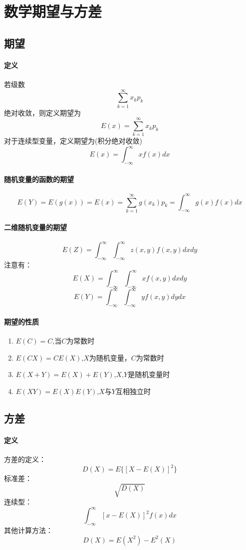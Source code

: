 \documentclass[12pt]{report}
\begin{document}
\section{数学期望与方差}
\subsection{期望}
\paragraph{定义}
若级数$$\sum_{k=1}^\infty x_k p_k$$
绝对收敛，则定义期望为
$$E(x)=\sum_{k=1}^{\infty} x_k p_k$$
对于连续型变量，定义期望为(积分绝对收敛)
$$E(x)=\int_{-\infty}^{\infty} x f(x)dx$$

\paragraph{随机变量的函数的期望}
$$E(Y)=E(g(x))=E(x)=\sum_{k=1}^{\infty} g(x_k) p_k=\int_{-\infty}^{\infty} g(x) f(x)dx$$
\paragraph{二维随机变量的期望}
$$E(Z)=\int_{-\infty}^{\infty} \int_{-\infty}^{\infty} z(x,y) f(x,y)dxdy$$
注意有：
$$E(X)=\int_{-\infty}^{\infty}\int_{-\infty}^{\infty} x f(x,y)dxdy$$
$$E(Y)=\int_{-\infty}^{\infty}\int_{-\infty}^{\infty} y f(x,y)dydx$$
\paragraph{期望的性质}
\begin{enumerate}
    \item $E(C)=C$,\quad \mbox{当$C$为常数时}
    \item $E(CX)=CE(X)$,\quad $X$\mbox{为随机变量}，$C$\mbox{为常数时}
    \item $E(X+Y)=E(X)+E(Y)$,\quad $X$,$Y$\mbox{是随机变量时}
    \item $E(XY)=E(X)E(Y)$,\quad $X$与$Y$\mbox{互相独立时}
\end{enumerate}
\subsection{方差}

\paragraph{定义}方差的定义：
$$D(X)=E\{[X-E(X)]^2\}$$
标准差：$$\sqrt{D(X)}$$
连续型：$$\int_{-\infty}^{\infty} [x-E(X)]^2f(x) dx$$
其他计算方法：
$$D(X)=E(X^2)-E^2(X)$$
\end{document}
